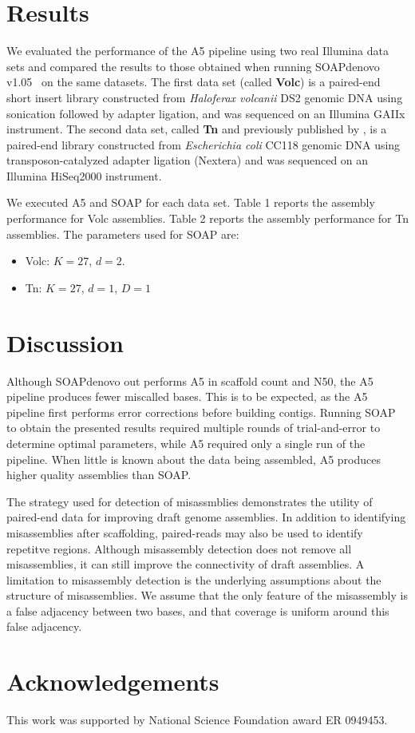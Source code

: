 \documentclass{bioinfo}
\begin{document}
\section{Results}

We evaluated the performance of the A5 pipeline using two real Illumina data sets and compared the results to
those obtained when running SOAPdenovo v1.05~\citep{Li2010} on the same datasets. The first data set (called \textbf{Volc}) is a paired-end short insert library constructed from \emph{Haloferax volcanii} DS2 genomic DNA 
using sonication followed by adapter ligation, and was sequenced on an Illumina GAIIx instrument. 
The second data set, called \textbf{Tn} and previously published by \citet{Adey2010}, is a paired-end library constructed from \emph{Escherichia coli} CC118 genomic DNA
using transposon-catalyzed adapter ligation (Nextera) and was sequenced on an Illumina HiSeq2000 instrument. 


We executed A5 and SOAP for each data set. Table 1 reports the assembly performance for Volc assemblies.
Table 2 reports the assembly performance for Tn assemblies. The parameters used for SOAP are:
\begin{itemize}
\item Volc: $K = 27$, $d = 2$.
\item Tn: $K = 27$, $d = 1$, $D = 1$
\end{itemize}


\section{Discussion}

Although SOAPdenovo out performs A5 in scaffold count and N50, the A5 pipeline produces fewer miscalled bases. This is to
be expected, as the A5 pipeline first performs error corrections before building contigs. Running SOAP to
obtain the presented results required multiple rounds of trial-and-error to determine optimal parameters, while A5 required
only a single run of the pipeline. When little is known about the data being assembled, A5 produces higher quality assemblies 
than SOAP.

The strategy used for detection of misassmblies demonstrates the utility of paired-end data for improving draft genome assemblies.
In addition to identifying misassemblies after scaffolding, paired-reads may also be used to identify repetitve regions.   
Although misassembly detection does not remove all misassemblies, it can still improve the connectivity of draft assemblies.
A limitation to misassembly detection is the underlying assumptions about the structure of misassemblies. We assume that the only
feature of the misassembly is a false adjacency between two bases, and that coverage is uniform around this false adjacency. 


\section*{Acknowledgements}
This work was supported by National Science Foundation award ER 0949453.



\end{document}
